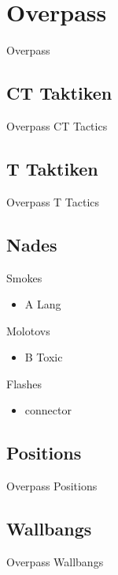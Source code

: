 \newpage




\chapter{Overpass}
\label{chap:overpass}
Overpass

\section{CT Taktiken}
\label{sect:overpass_ct}
Overpass CT Tactics

\section{T Taktiken}
\label{sect:overpass_t}
Overpass T Tactics

\section{Nades}
\label{sect:overpass_nades}
Smokes
\begin{itemize}
\item A Lang
\end{itemize}

Molotovs
\begin{itemize}
\item B Toxic
\end{itemize}

Flashes
\begin{itemize}
\item connector
\end{itemize}

\section{Positions}
\label{sect:overpass_positions}
Overpass Positions

\section{Wallbangs}
\label{sect:overpass_wallbangs}
Overpass Wallbangs
